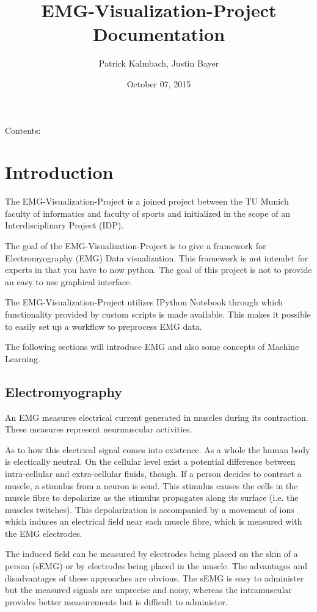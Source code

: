 \documentclass[letterpaper,10pt,english]{sphinxmanual}
\title{EMG-Visualization-Project Documentation}
\date{October 07, 2015}
\author{Patrick Kalmbach, Justin Bayer}
\begin{document}
\maketitle
\tableofcontents
{}\label{index::doc}


Contents:


\chapter{Introduction}
\label{intro:introduction}\label{intro::doc}\label{intro:welcome-to-emg-visualization-project-s-documentation}
The EMG-Visualization-Project is a joined project between the TU Munich faculty
of informatics and faculty of sports and initialized in the scope of an
Interdisciplinary Project (IDP).

The goal of the EMG-Visualization-Project is to give a framework for
Electromyography (EMG) Data visualization. This framework is not intendet for
experts in that you have to now python. The goal of this project is not to
provide an easy to use graphical interface.

The EMG-Visualization-Project utilizes IPython Notebook through which
functionality provided by custom scripts is made available.
This makes it possible to easily set up a workflow to preprocess EMG data.

The following sections will introduce EMG and also some concepts of Machine
Learning.


\section{Electromyography}
\label{intro:electromyography}
An EMG measures electrical current generated in muscles during its contraction.
These measures represent neurmuscular activities.

As to how this electrical signal comes into existence. As a whole the human
body is electically neutral. On the cellular level exist a potential difference
between intra-cellular and extra-cellular fluids, though. If a person decides
to contract a muscle, a stimulus from a neuron is send. This stimulus causes the
cells in the muscle fibre to depolarize as the stimulus propagates along its
surface (i.e. the muscles twitches). This depolarization is accompanied by a
movement of ions which induces an electrical field near each muscle fibre,
which is measured with the EMG electrodes.

The induced field can be measured by electrodes being placed on the skin of a
person (sEMG) or by electrodes being placed in the muscle. The advantages and
disadvantages of these approaches are obvious. The sEMG is easy to administer
but the measured signals are unprecise and noisy, whereas the intramuscular
provides better measurements but is difficult to administer.
\end{document}
